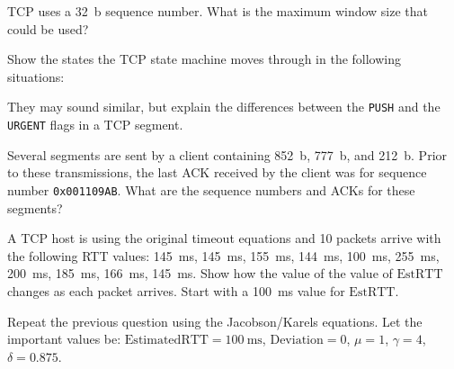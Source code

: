 \documentclass[12pt,addpoints,answers]{exam}
\begin{document}
\begin{questions}
\question[3] TCP uses a \SI{32}{b} sequence number. What is the maximum window size that could be used?
\begin{solution}
\end{solution}

\question[12] Show the states the TCP state machine moves through in the following situations:
\begin{solution}
\end{solution}

\question[4] They may sound similar, but explain the differences between the \lstinline{PUSH} and the \lstinline{URGENT} flags in a TCP segment.
\begin{solution}
\end{solution}

\question[6] Several segments are sent by a client containing \SI{852}{b}, \SI{777}{b}, and \SI{212}{b}. Prior to these transmissions, the last ACK received by the client was for sequence number \texttt{0x001109AB}. What are the sequence numbers and ACKs for these segments?
\begin{solution}
\end{solution}

\question[10] A TCP host is using the original timeout equations and 10 packets arrive with the following RTT values: \SI{145}{\milli\second}, \SI{145}{\milli\second}, \SI{155}{\milli\second}, \SI{144}{\milli\second}, \SI{100}{\milli\second}, \SI{255}{\milli\second}, \SI{200}{\milli\second}, \SI{185}{\milli\second}, \SI{166}{\milli\second}, \SI{145}{\milli\second}. Show how the value of the value of $\mathrm{EstRTT}$ changes as each packet arrives. Start with a \SI{100}{\milli\second} value for $\mathrm{EstRTT}$.
\begin{solution}
\end{solution}

\question[10] Repeat the previous question using the Jacobson/Karels equations. Let the important values be: $\mathrm{EstimatedRTT} = \SI{100}{\milli\second}$, $\mathrm{Deviation} = 0$, $\mu = 1$, $\gamma = 4$, $\delta = 0.875$.

\end{questions}
\end{document}

